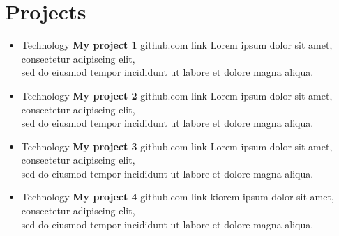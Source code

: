 \documentclass[letterpaper,9pt]{article}
\begin{document}
    \section{Projects}
    \begin{itemize}
        \item[]
       {Technology} 
       \hspace*{28pt}
        {\textbf{My project 1}} \hfill   github.com link
        \newline
        \hspace*{80pt}
        Lorem ipsum dolor sit amet, consectetur adipiscing elit, \\ \hspace*{80pt}
       sed do eiusmod tempor incididunt ut labore et dolore magna aliqua.
        \item[]
        {Technology} 
        \hspace*{28pt}
        {\textbf{My project 2}}  \hfill github.com link
        \newline
        \hspace*{80pt}
        Lorem ipsum dolor sit amet, consectetur adipiscing elit, \\   \hspace*{80pt}
       sed do eiusmod tempor incididunt ut labore et dolore magna aliqua.
       \item[]
       {Technology} 
       \hspace*{28pt}
       {\textbf{My project 3}}  \hfill github.com link
       \newline
       \hspace*{80pt}
      Lorem ipsum dolor sit amet, consectetur adipiscing elit, \\   \hspace*{80pt}
      sed do eiusmod tempor incididunt ut labore et dolore magna aliqua.
      \item[]
        {Technology} 
        \hspace*{28pt}
        {\textbf{My project 4}}  \hfill github.com link
        \newline
        \hspace*{80pt}
        kiorem ipsum dolor sit amet, consectetur adipiscing elit, \\   \hspace*{80pt}
       sed do eiusmod tempor incididunt ut labore et dolore magna aliqua.
    \end{itemize}
    
    \vspace{-10 pt}
\end{document}
